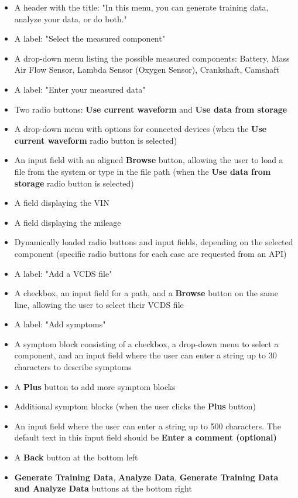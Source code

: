 \documentclass[]{scrreprt}
\begin{document}
\begin{itemize}
\begin{itemize}
    \item A header with the title: "In this menu, you can generate training data, analyze your data, or do both."
    \item A label: "Select the measured component"
    \item A drop-down menu listing the possible measured components: Battery, Mass Air Flow Sensor, Lambda Sensor (Oxygen Sensor), Crankshaft, Camshaft
    \item A label: "Enter your measured data"
    \item Two radio buttons: \textbf{Use current waveform} and \textbf{Use data from storage}
    \item A drop-down menu with options for connected devices (when the \textbf{Use current waveform} radio button is selected)
    \item An input field with an aligned \textbf{Browse} button, allowing the user to load a file from the system or type in the file path (when the \textbf{Use data from storage} radio button is selected)
    \item A field displaying the VIN
    \item A field displaying the mileage
    \item Dynamically loaded radio buttons and input fields, depending on the selected component (specific radio buttons for each case are requested from an API)
    \item A label: "Add a VCDS file"
    \item A checkbox, an input field for a path, and a \textbf{Browse} button on the same line, allowing the user to select their VCDS file
    \item A label: "Add symptoms"
    \item A symptom block consisting of a checkbox, a drop-down menu to select a component, and an input field where the user can enter a string up to 30 characters to describe symptoms
    \item A \textbf{Plus} button to add more symptom blocks
    \item Additional symptom blocks (when the user clicks the \textbf{Plus} button)
    \item An input field where the user can enter a string up to 500 characters. The default text in this input field should be \textbf{Enter a comment (optional)}
    \item A \textbf{Back} button at the bottom left
    \item \textbf{Generate Training Data}, \textbf{Analyze Data}, \textbf{Generate Training Data and Analyze Data} buttons at the bottom right
\end{itemize}



\end{itemize}
\end{document}
